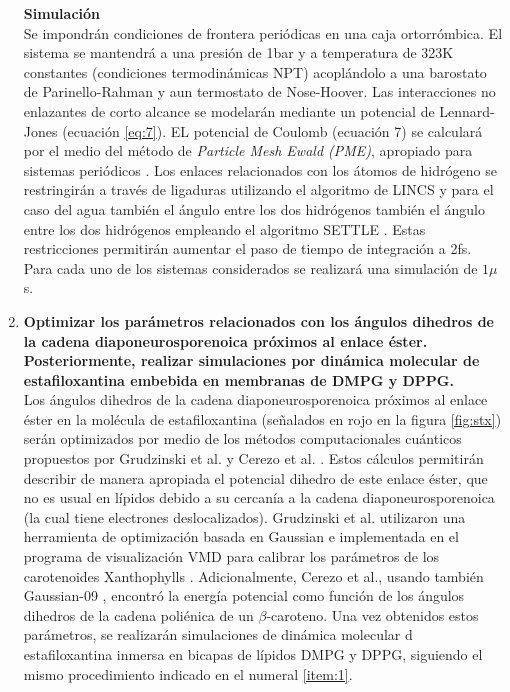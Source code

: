\begin{enumerate}
\textbf{Simulación}\\
Se impondrán condiciones de frontera periódicas en una caja ortorrómbica. El sistema se mantendrá a una presión de 1bar y a temperatura de 323K constantes (condiciones termodinámicas NPT) acoplándolo a una barostato de Parinello-Rahman \cite{Parrinello1981PolymorphicMethod} y aun termostato de Nose-Hoover. Las interacciones no enlazantes de corto alcance se modelarán mediante un potencial de Lennard-Jones (ecuación \eqref{eq:7}). EL potencial de Coulomb (ecuación 7) se calculará por el medio del método de \textit{Particle Mesh Ewald (PME)}, apropiado para sistemas periódicos \cite{Darden1993ParticleSystems}. Los enlaces relacionados con los átomos de hidrógeno  se restringirán a través de ligaduras utilizando el algoritmo de LINCS \cite{Hess1997LINCS:Simulations} y para el caso del agua también el ángulo entre los dos hidrógenos también el ángulo entre los dos hidrógenos empleando el algoritmo SETTLE \cite{Miyamoto1992Settle:Models}. Estas restricciones permitirán aumentar el paso de tiempo de integración a 2fs. Para cada uno de los sistemas considerados se realizará una simulación de $1\mu$s.\\
\item \textbf{Optimizar los parámetros relacionados  con los ángulos dihedros de la cadena diaponeurosporenoica próximos al enlace éster. Posteriormente, realizar simulaciones por dinámica molecular de estafiloxantina embebida en membranas de DMPG y DPPG.}\label{item:2}\\

Los ángulos dihedros de la cadena diaponeurosporenoica próximos al enlace éster en la molécula de estafiloxantina (señalados en rojo en la figura \ref{fig:stx}) serán optimizados por medio de los métodos computacionales cuánticos propuestos por Grudzinski et al. \cite{Grudzinski2017LocalizationBilayer} y Cerezo et al. \cite{Cerezo2012AntioxidantSimulations}. Estos cálculos permitirán describir de manera apropiada el potencial dihedro de este enlace éster, que no es usual en lípidos debido a su cercanía a la cadena diaponeurosporenoica (la cual tiene electrones deslocalizados). Grudzinski et al. \cite{Grudzinski2017LocalizationBilayer} utilizaron una herramienta de optimización basada en Gaussian e implementada en el programa de visualización VMD para calibrar los parámetros de los carotenoides Xanthophylls \cite{Grudzinski2017LocalizationBilayer}. Adicionalmente, Cerezo et al., usando también Gaussian-09 \cite{Cerezo2012AntioxidantSimulations}, encontró la energía potencial como función de los ángulos dihedros de la cadena poliénica de un $\beta$-caroteno. Una vez obtenidos estos parámetros, se realizarán simulaciones de dinámica molecular d estafiloxantina inmersa en bicapas de lípidos DMPG y DPPG, siguiendo el mismo procedimiento indicado en el numeral \ref{item:1}.\\


\end{enumerate}
